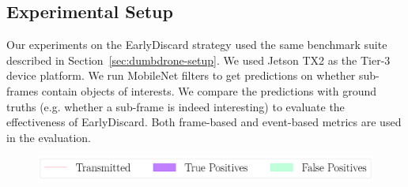 \subsection{Experimental Setup}

Our experiments on the {\xc EarlyDiscard} strategy used the same benchmark suite
described in Section~\ref{sec:dumbdrone-setup}. We used Jetson TX2 as the Tier-3
device platform. We run MobileNet filters to get predictions on whether
sub-frames contain objects of interests. We compare the predictions with ground
truths (e.g. whether a sub-frame is indeed interesting) to evaluate the
effectiveness of EarlyDiscard. Both frame-based and event-based metrics are used
in the evaluation.

\begin{figure}
\centering
\includegraphics[width=\linewidth]{FIGS/fig-event-recall-frame-percentage-legend.pdf}


\end{figure}
